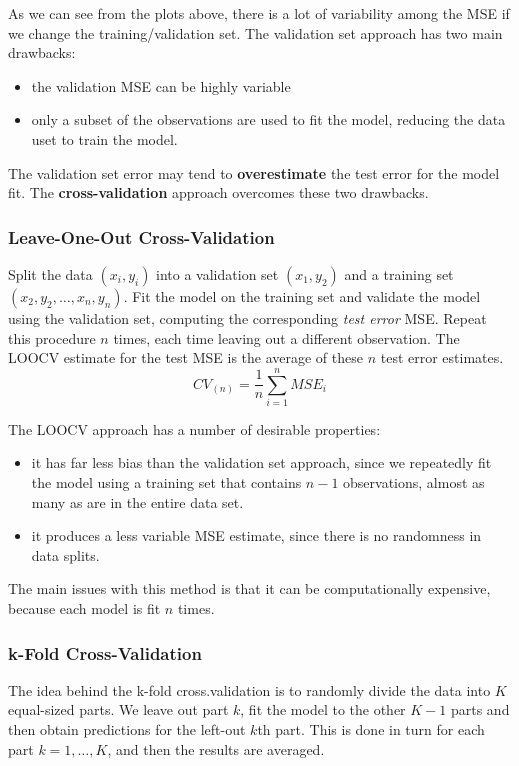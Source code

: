As we can see from the plots above, there is a lot of variability among the MSE if we change the training/validation set. The validation set approach has two main drawbacks:
\begin{itemize}
    \item the validation MSE can be highly variable
    \item only a subset of the observations are used to fit the model, reducing the data uset to train the model.
\end{itemize}
The validation set error may tend to \textbf{overestimate} the test error for the model fit. The \textbf{cross-validation} approach overcomes these two drawbacks.

\subsubsection*{Leave-One-Out Cross-Validation}
Split the data ${(x_i, y_i)}$ into a validation set $(x_1,y_2)$ and a training set $(x_2, y_2, \dots, x_n, y_n)$. Fit the model on the training set and validate the model using the validation set, computing the corresponding \textit{test error} MSE. Repeat this procedure $n$ times, each time leaving out a different observation. The LOOCV estimate for the test MSE is the average of these $n$ test error estimates.
\[
    CV_{(n)} = \frac{1}{n} \sum_{i=1}^{n} MSE_i
\]

The LOOCV approach has a number of desirable properties:
\begin{itemize}
    \item it has far less bias than the validation set approach, since we repeatedly fit the model using a training set that contains $n-1$ observations, almost as many as are in the entire data set.
    \item it produces a less variable MSE estimate, since there is no randomness in data splits.
\end{itemize}

The main issues with this method is that it can be computationally expensive, because each model is fit $n$ times.

\subsubsection*{k-Fold Cross-Validation}
The idea behind the k-fold cross.validation is to randomly divide the data into $K$ equal-sized parts. We leave out part $k$, fit the model to the other $K-1$ parts and then obtain predictions for the left-out $k$th part. This is done in turn for each part $k = 1, \dots, K$, and then the results are averaged.


